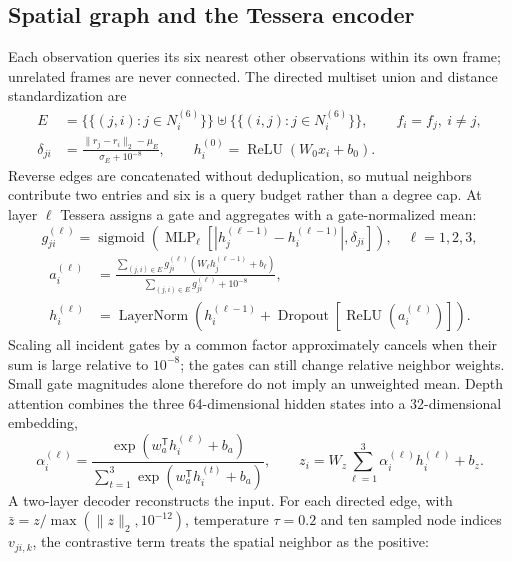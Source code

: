 \documentclass[11pt]{article}
\begin{document}
\subsection{Spatial graph and the Tessera encoder}
Each observation queries its six nearest other observations within its own frame; unrelated frames are never connected. The directed multiset union and distance standardization are
\begin{align}
E&=\{\!\{(j,i):j\in N_i^{(6)}\}\!\}\uplus\{\!\{(i,j):j\in N_i^{(6)}\}\!\},\qquad f_i=f_j,\ i\ne j,\label{eq:graph}\\
\delta_{ji}&=\frac{\lVert r_j-r_i\rVert_2-\mu_E}{\sigma_E+10^{-8}},\qquad
h_i^{(0)}=\operatorname{ReLU}(W_0x_i+b_0).\label{eq:input}
\end{align}
Reverse edges are concatenated without deduplication, so mutual neighbors contribute two entries and six is a query budget rather than a degree cap. At layer \(\ell\) Tessera assigns a gate and aggregates with a gate-normalized mean:
\begin{equation}
g_{ji}^{(\ell)}=\operatorname{sigmoid}\!\left(\operatorname{MLP}_{\ell}\left[|h_j^{(\ell-1)}-h_i^{(\ell-1)}|,\delta_{ji}\right]\right),\quad\ell=1,2,3,\label{eq:gate}
\end{equation}
\begin{equation}\begin{aligned}
a_i^{(\ell)}&=\frac{\sum_{(j,i)\in E}g_{ji}^{(\ell)}(W_{\ell}h_j^{(\ell-1)}+b_{\ell})}{\sum_{(j,i)\in E}g_{ji}^{(\ell)}+10^{-8}},\\
h_i^{(\ell)}&=\operatorname{LayerNorm}\left(h_i^{(\ell-1)}+\operatorname{Dropout}[\operatorname{ReLU}(a_i^{(\ell)})]\right).
\end{aligned}
\label{eq:aggregate}
\end{equation}
Scaling all incident gates by a common factor approximately cancels when their sum is large relative to \(10^{-8}\); the gates can still change relative neighbor weights. Small gate magnitudes alone therefore do not imply an unweighted mean. Depth attention combines the three 64-dimensional hidden states into a 32-dimensional embedding,
\begin{equation}
\alpha_i^{(\ell)}=\frac{\exp(w_a^{\mathsf T}h_i^{(\ell)}+b_a)}{\sum_{t=1}^3\exp(w_a^{\mathsf T}h_i^{(t)}+b_a)},\qquad
z_i=W_z\sum_{\ell=1}^3\alpha_i^{(\ell)}h_i^{(\ell)}+b_z.\label{eq:fusion}
\end{equation}
A two-layer decoder reconstructs the input. For each directed edge, with \(\bar z=z/\max(\lVert z\rVert_2,10^{-12})\), temperature \(\tau=0.2\) and ten sampled node indices \(v_{ji,k}\), the contrastive term treats the spatial neighbor as the positive:
\end{document}
